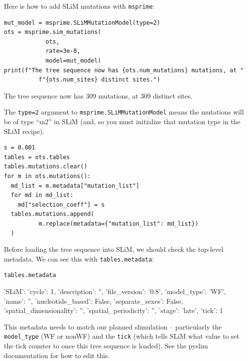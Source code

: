 \documentclass[12pt]{article}
\newcommand{\msprime}[0]{\texttt{msprime}\xspace}
\begin{document}
Here is how to add SLiM mutations with \msprime :
\begin{listing}[H]
    \begin{verbatim}
mut_model = msprime.SLiMMutationModel(type=2)
ots = msprime.sim_mutations(
            ots,
            rate=3e-8,
            model=mut_model)
print(f"The tree sequence now has {ots.num_mutations} mutations, at "
          f"{ots.num_sites} distinct sites.")
  \end{verbatim}
\end{listing}
\begin{pycon}
The tree sequence now has 309 mutations, at 309 distinct sites.
\end{pycon}
The \verb|type=2| argument to \verb|msprime.SLiMMutationModel|
means the mutations will be of type ``m2'' in SLiM
(and, so you must initialize that mutation type in the SLiM recipe).

\begin{listing}[H]
    \begin{verbatim}
s = 0.001
tables = ots.tables
tables.mutations.clear()
for m in ots.mutations():
  md_list = m.metadata["mutation_list"]
  for md in md_list:
    md["selection_coeff"] = s
  tables.mutations.append(
          m.replace(metadata={"mutation_list": md_list})
  )
  \end{verbatim}
\end{listing}

Before loading the tree sequence into SLiM,
we should check the top-level metadata.
We can see this with \verb|tables.metadata|:
\begin{listing}[H]
    \begin{verbatim}
tables.metadata
    \end{verbatim}
\end{listing}
\begin{pycon}
{
    'SLiM': {
        'cycle': 1, 
        'description': '', 
        'file_version': '0.8', 
        'model_type': 'WF', 
        'name': '', 
        'nucleotide_based': False, 
        'separate_sexes': False, 
        'spatial_dimensionality': '', 
        'spatial_periodicity': '', 
        'stage': 'late', 
        'tick': 1
        }
}
\end{pycon}
This metadata needs to match our planned slimulation --
particularly the \verb|model_type| (WF or nonWF) and the \verb|tick|
(which tells SLiM what value to set the tick counter to once this tree sequence is loaded).
See the pyslim documentation for how to edit this.
\end{document}
